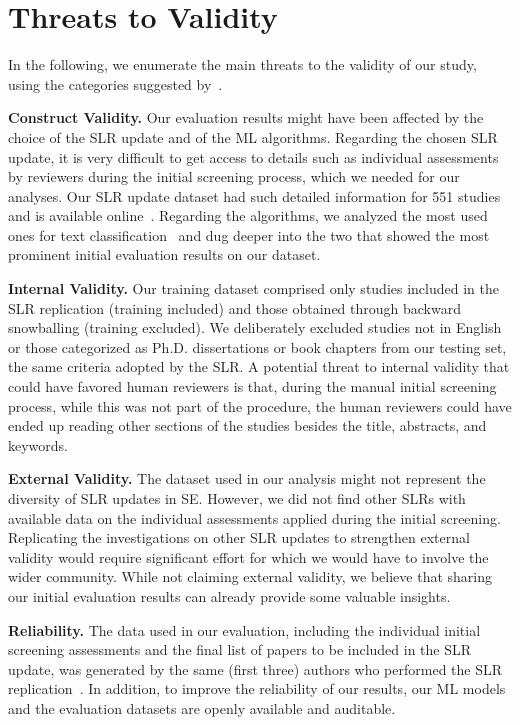 \section{Threats to Validity}
\label{sec:threats}

In the following, we enumerate the main threats to the validity of our study, using the categories suggested by~\cite{Runeson12}.

\textbf{Construct Validity.}
Our evaluation results might have been affected by the choice of the SLR update and of the ML algorithms. Regarding the chosen SLR update, it is very difficult to get access to details such as individual assessments by reviewers during the initial screening process, which we needed for our analyses. Our SLR update dataset had such detailed information for 551 studies and is available online~\cite{zenodoOpenScience}. Regarding the algorithms, we analyzed the most used ones for text classification~\cite{pintas2021feature} and dug deeper into the two that showed the most prominent initial evaluation results on our dataset. 

\textbf{Internal Validity.}
Our training dataset comprised only studies included in the SLR replication \cite{Wohlin2022} (training included) and those obtained through backward snowballing (training excluded). We deliberately excluded studies not in English or those categorized as Ph.D. dissertations or book chapters from our testing set, the same criteria adopted by the SLR. A potential threat to internal validity that could have favored human reviewers is that, during the manual initial screening process, while this was not part of the procedure, the human reviewers could have ended up reading other sections of the studies besides the title, abstracts, and keywords.

\textbf{External Validity.} The dataset used in our analysis might not represent the diversity of SLR updates in SE. However, we did not find other SLRs with available data on the individual assessments applied during the initial screening. Replicating the investigations on other SLR updates to strengthen external validity would require significant effort for which we would have to involve the wider community. While not claiming external validity, we believe that sharing our initial evaluation results can already provide some valuable insights.

\textbf{Reliability.} The data used in our evaluation, including the individual initial screening assessments and the final list of papers to be included in the SLR update, was generated by the same (first three) authors who performed the SLR replication~\cite{Wohlin2022}. In addition, to improve the reliability of our results, our ML models and the evaluation datasets are openly available and auditable. 